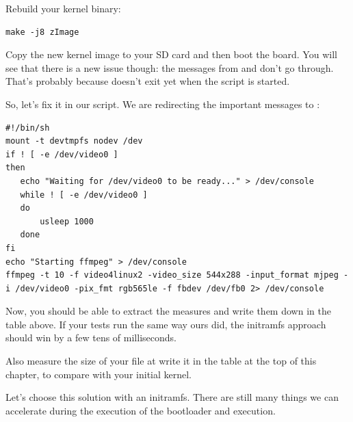 Rebuild your kernel binary:
\begin{verbatim}
make -j8 zImage
\end{verbatim}

Copy the new kernel image to your SD card and then boot the board. You
will see that there is a new issue though: the messages from 
and  don't go through. That's probably because
 doesn't exit yet when the script is started.

So, let's fix it in our script. We are redirecting the important
messages to :

{\scriptsize
\begin{verbatim}
#!/bin/sh
mount -t devtmpfs nodev /dev
if ! [ -e /dev/video0 ]
then
   echo "Waiting for /dev/video0 to be ready..." > /dev/console
   while ! [ -e /dev/video0 ]
   do
       usleep 1000
   done
fi
echo "Starting ffmpeg" > /dev/console
ffmpeg -t 10 -f video4linux2 -video_size 544x288 -input_format mjpeg -i /dev/video0 -pix_fmt rgb565le -f fbdev /dev/fb0 2> /dev/console
\end{verbatim}
}

Now, you should be able to extract the measures and write them down in
the table above. If your tests run the same way ours did, the
initramfs approach should win by a few tens of milliseconds.

Also measure the size of your  file at write it in the
table at the top of this chapter, to compare with your initial kernel.

Let's choose this solution with an initramfs. There are still many things we can
accelerate during the execution of the bootloader and execution.
